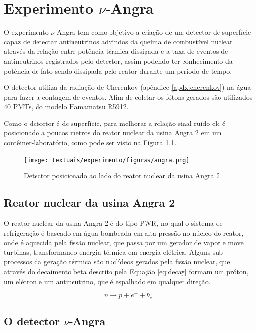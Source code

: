\chapter{Experimento $\nu$-Angra}\label{cap:experimento}
\vspace{-2cm}

O experimento $\nu$-Angra tem como objetivo a criação de um detector de superfície capaz de detectar antineutrinos advindos da queima de combustível nuclear através da relação entre potência térmica dissipada e a taxa de eventos de antineutrinos registrados pelo detector, assim podendo ter conhecimento da potência de fato sendo dissipada pelo reator durante um período de tempo.

O detector utiliza da radiação de Cherenkov (apêndice \ref{apdx:cherenkov}) na água para fazer a contagem de eventos. Afim de coletar os fótons gerados são utilizados 40 PMTs, do modelo Hamamatsu R5912.

Como o detector é de superfície, para melhorar a relação sinal ruído ele é posicionado a poucos metros do reator nuclear da usina Angra 2 em um contêiner-laboratório, como pode ser visto na Figura \ref{fig:angra}.

\begin{figure}[H]
	\centering
	\texttt{[image: textuais/experimento/figuras/angra.png]}
	\caption{Detector posicionado ao lado do reator nuclear da usina Angra 2}
	\label{fig:angra}
\end{figure}

\section{Reator nuclear da usina Angra 2}

O reator nuclear da usina Angra 2 é do tipo \ac{PWR}, no qual o sistema de refrigeração é baseado em água bombeada em alta pressão no núcleo do reator, onde é aquecida pela fissão nuclear, que passa por um gerador de vapor e move turbinas, transformando energia térmica em energia elétrica. Alguns sub-processos da geração térmica são nuclídeos gerados pela fissão nuclear, que através do decaimento beta descrito pela Equação \ref{eq:decay} formam um próton, um elétron e um antineutrino, que é espalhado em qualquer direção.

\begin{equation}
n \rightarrow p + e^- + \bar{\nu}_e 
\label{eq:decay}
\end{equation}


\section{O detector $\nu$-Angra} \label{sec:detector}

